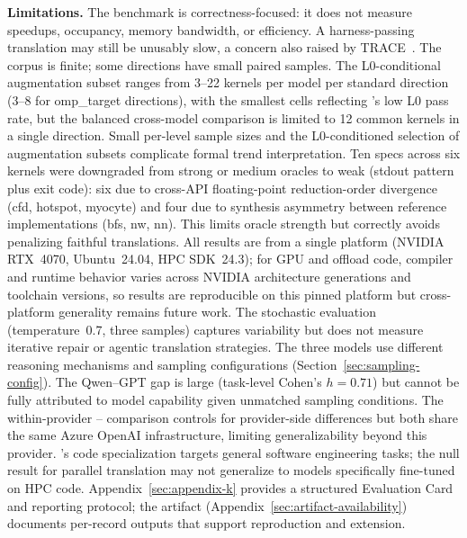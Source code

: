 \textbf{Limitations.} The benchmark is correctness-focused: it does not measure speedups, occupancy, memory bandwidth, or efficiency. A harness-passing translation may still be unusably slow, a concern also raised by TRACE~\cite{TRACE2026}. The corpus is finite; some directions have small paired samples. The L0-conditional augmentation subset ranges from 3--22 kernels per model per standard direction (3--8 for omp\_target directions), with the smallest cells reflecting \qwenshort{}'s low L0 pass rate, but the balanced cross-model comparison is limited to 12 common kernels in a single direction. Small per-level sample sizes and the L0-conditioned selection of augmentation subsets complicate formal trend interpretation. Ten specs across six kernels were downgraded from strong or medium oracles to weak (stdout pattern plus exit code): six due to cross-API floating-point reduction-order divergence (cfd, hotspot, myocyte) and four due to synthesis asymmetry between reference implementations (bfs, nw, nn). This limits oracle strength but correctly avoids penalizing faithful translations. All results are from a single platform (NVIDIA RTX~4070, Ubuntu~24.04, HPC SDK~24.3); for GPU and offload code, compiler and runtime behavior varies across NVIDIA architecture generations and toolchain versions, so results are reproducible on this pinned platform but cross-platform generality remains future work. The stochastic evaluation (temperature~0.7, three samples) captures variability but does not measure iterative repair or agentic translation strategies. The three models use different reasoning mechanisms and sampling configurations (Section~\ref{sec:sampling-config}). The Qwen--GPT gap is large (task-level Cohen's $h = 0.71$) but cannot be fully attributed to model capability given unmatched sampling conditions. The within-provider \gptnew{}--\codex{} comparison controls for provider-side differences but both share the same Azure OpenAI infrastructure, limiting generalizability beyond this provider. \codex{}'s code specialization targets general software engineering tasks; the null result for parallel translation may not generalize to models specifically fine-tuned on HPC code. Appendix~\ref{sec:appendix-k} provides a structured Evaluation Card and reporting protocol; the artifact (Appendix~\ref{sec:artifact-availability}) documents per-record outputs that support reproduction and extension.


